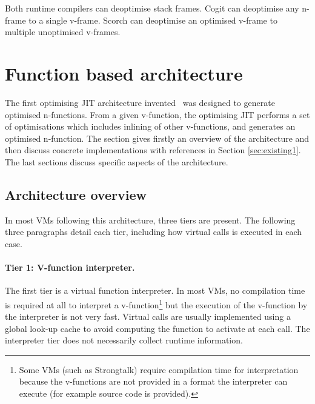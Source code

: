 \documentclass[a4paper,12pt,twoside]{../includes/ThesisStyle}
\begin{document}
Both runtime compilers can deoptimise stack frames. Cogit can deoptimise any n-frame to a single v-frame. Scorch can deoptimise an optimised v-frame to multiple unoptimised v-frames. 


\section{Function based architecture}
\label{sec:architecture}

The first optimising JIT architecture invented~\cite{UrsPHD} was designed to generate optimised n-functions. From a given v-function, the optimising JIT performs a set of optimisations which includes inlining of other v-functions, and generates an optimised n-function. The section gives firstly an overview of the architecture and then discuss concrete implementations with references in Section \ref{sec:existing1}. The last sections discuss specific aspects of the architecture.

\subsection{Architecture overview}

In most VMs following this architecture, three tiers are present. The following three paragraphs detail each tier, including how virtual calls is executed in each case.

\paragraph{Tier 1: V-function interpreter. } The first tier is a virtual function interpreter. In most VMs, no compilation time is required at all to interpret a v-function\footnote{Some VMs (such as Strongtalk) require compilation time for interpretation because the v-functions are not provided in a format the interpreter can execute (for example source code is provided).} but the execution of the v-function by the interpreter is not very fast. Virtual calls are usually implemented using a global look-up cache to avoid computing the function to activate at each call. The interpreter tier does not necessarily collect runtime information. 
\end{document}
